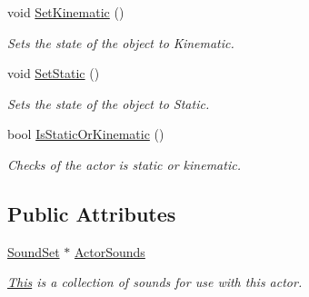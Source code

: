 \begin{DoxyCompactItemize}
void \hyperlink{classphys_1_1ActorBase_acd5613286ec14fb2a8e5ed5f5003dc5f}{SetKinematic} ()
\begin{DoxyCompactList}\small\item\em Sets the state of the object to Kinematic. \item\end{DoxyCompactList}\item 
void \hyperlink{classphys_1_1ActorBase_af0219532fe71d1d84042a20a88fe5037}{SetStatic} ()
\begin{DoxyCompactList}\small\item\em Sets the state of the object to Static. \item\end{DoxyCompactList}\item 
bool \hyperlink{classphys_1_1ActorBase_a0758873d315a0f70871649493d78d739}{IsStaticOrKinematic} ()
\begin{DoxyCompactList}\small\item\em Checks of the actor is static or kinematic. \item\end{DoxyCompactList}\end{DoxyCompactItemize}
\subsection*{Public Attributes}
\begin{DoxyCompactItemize}
\item 
\hypertarget{classphys_1_1ActorBase_a2d56e2b3470bfc7dfc6d9ce8c4158d81}{
\hyperlink{namespacephys_ab780c3162da5699fe421f3739ba03fc4}{SoundSet} $\ast$ \hyperlink{classphys_1_1ActorBase_a2d56e2b3470bfc7dfc6d9ce8c4158d81}{ActorSounds}}
\label{d8/d0f/classphys_1_1ActorBase_a2d56e2b3470bfc7dfc6d9ce8c4158d81}

\begin{DoxyCompactList}\small\item\em \hyperlink{structThis}{This} is a collection of sounds for use with this actor. \item\end{DoxyCompactList}\end{DoxyCompactItemize}

